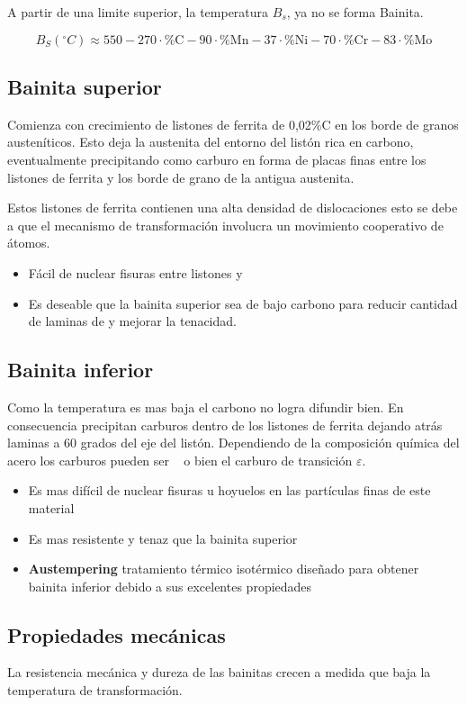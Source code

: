 A partir de una limite superior, la temperatura $B_s$, ya no se forma Bainita.

\[
B_{S}\left(^{\circ} C\right)\approx550-270 \cdot\%\mathrm{C}-90\cdot\%\mathrm{Mn}-37 \cdot\%\mathrm{Ni}-70 \cdot\%\mathrm{Cr}-83\cdot\%\mathrm{Mo}
\]

\subsection{Bainita superior}
Comienza con crecimiento de listones de ferrita de 0,02\%C en los borde de granos austeníticos. Esto deja la austenita del entorno del listón rica en carbono, eventualmente precipitando como carburo en forma de placas finas entre los listones de ferrita y los borde de grano de la antigua austenita.

Estos listones de ferrita contienen una alta densidad de dislocaciones esto se debe a que el mecanismo de transformación involucra un movimiento cooperativo de átomos.
\begin{itemize}
    \item Fácil de nuclear fisuras entre listones y \cementita
    \item Es deseable que la bainita superior sea de bajo carbono para reducir cantidad de laminas de \cementita y mejorar la tenacidad.
\end{itemize}



\subsection{Bainita inferior}
Como la temperatura es mas baja el carbono no logra difundir bien. En consecuencia precipitan carburos dentro de los listones de ferrita dejando atrás laminas a 60 grados del eje del listón. Dependiendo de la composición química del acero los carburos pueden ser \cementita~ o bien el carburo de transición $\varepsilon$.
\begin{itemize}
    \item Es mas difícil de nuclear fisuras u hoyuelos en las partículas finas de este material
    \item Es mas resistente y tenaz que la bainita superior
    \item \textbf{Austempering} tratamiento térmico isotérmico diseñado para obtener bainita inferior debido a sus excelentes propiedades 
\end{itemize}


\subsection{Propiedades mecánicas}
La resistencia mecánica y dureza de las bainitas crecen a medida que baja la temperatura de transformación.


